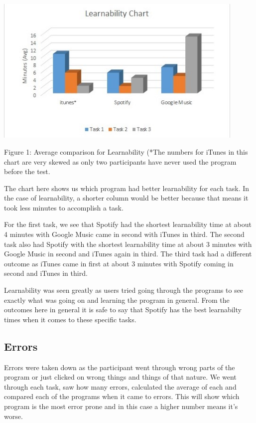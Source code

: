 \documentclass{article}
\begin{document}
\begin{center}
\includegraphics[width=120mm]{Learnability.jpg}
\end{center}
\begin{center}
Figure 1: Average comparison for Learnability (*The numbers for iTunes in this chart are very skewed as only two participants have never used the program before the test.
\end{center}

The chart here shows us which program had better learnability for each task. In the case of learnability, a shorter column would be better because that means it took less minutes to accomplish a task. 

For the first task, we see that Spotify had the shortest learnability time at about 4 minutes with Google Music came in second with iTunes in third. The second task also had Spotify with the shortest learnability time at about 3 minutes with Google Music in second and iTunes again in third. The third task had a different outcome as iTunes came in first at about 3 minutes with Spotify coming in second and iTunes in third.

Learnability was seen greatly as users tried going through the programs to see exactly what was going on and learning the program in general. From the outcomes here in general it is safe to say that Spotify has the best learnabilty times when it comes to these specific tasks.

\subsection{Errors}
Errors were taken down as the participant went through wrong parts of the program or just clicked on wrong things and things of that nature. We went through each task, saw how many errors, calculated the average of each and compared each of the programs when it came to errors. This will show which program is the most error prone and in this case a higher number means it's worse.
\end{document}
